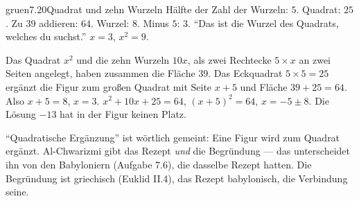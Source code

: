 \begin{loesungkarte}{gruen}{7.20}{Quadrat und zehn Wurzeln}
Hälfte der Zahl der Wurzeln: $5$. Quadrat: $25$. Zu $39$ addieren: $64$. Wurzel: $8$. Minus $5$: $3$. \enquote{Das ist die Wurzel des Quadrats, welches du suchst.} $x = 3$, $x^{2} = 9$.
\begin{center}
\end{center}
Das Quadrat $x^{2}$ und die zehn Wurzeln $10x$, als zwei Rechtecke $5\times x$ an zwei Seiten angelegt, haben zusammen die Fläche $39$. Das Eckquadrat $5\times5 = 25$ ergänzt die Figur zum großen Quadrat mit Seite $x + 5$ und Fläche $39 + 25 = 64$. Also $x + 5 = 8$, $x = 3$.
$x^{2} + 10x + 25 = 64$, $(x + 5)^{2} = 64$, $x = -5\pm8$. Die Lösung $-13$ hat in der Figur keinen Platz.
\begin{mitnehmen}\kastentext
\enquote{Quadratische Ergänzung} ist wörtlich gemeint: Eine Figur wird zum Quadrat ergänzt. Al-Chwarizmi gibt das Rezept \emph{und} die Begründung --- das unterscheidet ihn von den Babyloniern (Aufgabe 7.6), die dasselbe Rezept hatten. Die Begründung ist griechisch (Euklid II.4), das Rezept babylonisch, die Verbindung seine.
\end{mitnehmen}
\end{loesungkarte}


